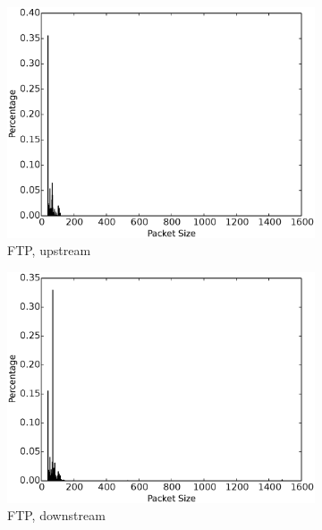 \begin{figure}
\begin{subfigure}{.16\linewidth}
\includegraphics[width=\linewidth]{image/ftp_pkt_size_upstream.eps}
\caption{FTP, upstream}
\label{fig:ftp_pkt_size_upstream}
\end{subfigure}
\begin{subfigure}{.16\linewidth}
\centering
\includegraphics[width=\linewidth]{image/ftp_pkt_size_downstream.eps}
\caption{FTP, downstream}
\label{fig:ftp_pkt_size_downstream}
\end{subfigure}
\begin{subfigure}{.16\linewidth}
\centering

\end{subfigure}
\end{figure}
